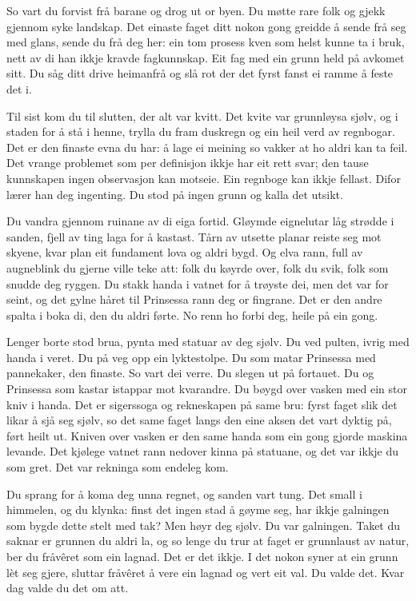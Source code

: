 So vart du forvist frå barane og drog ut or byen. Du møtte rare folk og gjekk gjennom syke landskap. Det einaste faget ditt nokon gong greidde å sende frå seg med glans, sende du frå deg her: ein tom prosess kven som helst kunne ta i bruk, nett av di han ikkje kravde fagkunnskap. Eit fag med ein grunn held på avkomet sitt. Du såg ditt drive heimanfrå og slå rot der det fyrst fanst ei ramme å feste det i.

Til sist kom du til slutten, der alt var kvitt. Det kvite var grunnløysa sjølv, og i staden for å stå i henne, trylla du fram duskregn og ein heil verd av regnbogar. Det er den finaste evna du har: å lage ei meining so vakker at ho aldri kan ta feil. Det vrange problemet som per definisjon ikkje har eit rett svar; den tause kunnskapen ingen observasjon kan motseie. Ein regnboge kan ikkje fellast. Difor lærer han deg ingenting. Du stod på ingen grunn og kalla det utsikt.

Du vandra gjennom ruinane av di eiga fortid. Gløymde eignelutar låg strødde i sanden, fjell av ting laga for å kastast. Tårn av utsette planar reiste seg mot skyene, kvar plan eit fundament lova og aldri bygd. Og elva rann, full av augneblink du gjerne ville teke att: folk du køyrde over, folk du svik, folk som snudde deg ryggen. Du stakk handa i vatnet for å trøyste dei, men det var for seint, og det gylne håret til Prinsessa rann deg or fingrane. Det er den andre spalta i boka di, den du aldri førte. No renn ho forbi deg, heile på ein gong.

Lenger borte stod brua, pynta med statuar av deg sjølv. Du ved pulten, ivrig med handa i veret. Du på veg opp ein lyktestolpe. Du som matar Prinsessa med pannekaker, den finaste. So vart dei verre. Du slegen ut på fortauet. Du og Prinsessa som kastar istappar mot kvarandre. Du bøygd over vasken med ein stor kniv i handa. Det er sigerssoga og rekneskapen på same bru: fyrst faget slik det likar å sjå seg sjølv, so det same faget langs den eine aksen det vart dyktig på, ført heilt ut. Kniven over vasken er den same handa som ein gong gjorde maskina levande. Det kjølege vatnet rann nedover kinna på statuane, og det var ikkje du som gret. Det var rekninga som endeleg kom.

Du sprang for å koma deg unna regnet, og sanden vart tung. Det small i himmelen, og du klynka: finst det ingen stad å gøyme seg, har ikkje galningen som bygde dette stelt med tak? Men høyr deg sjølv. Du var galningen. Taket du saknar er grunnen du aldri la, og so lenge du trur at faget er grunnlaust av natur, ber du fråvêret som ein lagnad. Det er det ikkje. I det nokon syner at ein grunn lèt seg gjere, sluttar fråvêret å vere ein lagnad og vert eit val. Du valde det. Kvar dag valde du det om att.

